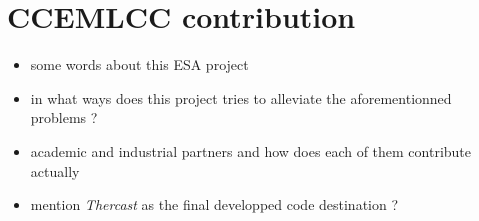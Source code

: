 \section*{CCEMLCC contribution}
\begin{itemize}
\item some words about this ESA project
\item in what ways does this project tries to alleviate the aforementionned problems ?
\item academic and industrial partners and how does each of them contribute actually
\item mention \emph{Thercast} as the final developped code destination ?
\end{itemize}


